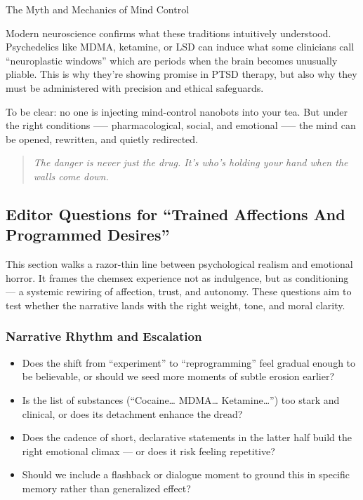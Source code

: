 \begin{PsychologicalSidebar}{The Myth and Mechanics of Mind Control}
  \medskip
  
  Modern neuroscience confirms what these traditions intuitively understood. Psychedelics like MDMA, ketamine, or LSD 
  can induce what some clinicians call “neuroplastic windows” which are periods when the brain becomes unusually 
  pliable. This is why they’re showing promise in PTSD therapy, but also why they must be administered with 
  precision and ethical safeguards. 

  \medskip
  
  To be clear: no one is injecting mind-control nanobots into your tea. But under the right conditions 
  —-- pharmacological, social, and emotional —-- the mind can be opened, rewritten, and quietly 
  redirected.
  
  \begin{quote}
  \textit{The danger is never just the drug. It’s who’s holding your hand when the walls come down.}
  \end{quote}
  
\end{PsychologicalSidebar}

\medskip


\subsection*{Editor Questions for ``Trained Affections And Programmed Desires''}

This section walks a razor-thin line between psychological realism and emotional horror. It frames the 
chemsex experience not as indulgence, but as conditioning — a systemic rewiring of affection, trust, 
and autonomy. These questions aim to test whether the narrative lands with the right weight, tone, 
and moral clarity.

\subsubsection*{Narrative Rhythm and Escalation}

\begin{itemize}
  \item Does the shift from “experiment” to “reprogramming” feel gradual enough to be believable, or should we seed more moments of subtle erosion earlier?
  \item Is the list of substances (``Cocaine… MDMA… Ketamine…'') too stark and clinical, or does its detachment enhance the dread?
  \item Does the cadence of short, declarative statements in the latter half build the right emotional climax — or does it risk feeling repetitive?
  \item Should we include a flashback or dialogue moment to ground this in specific memory rather than generalized effect?
\end{itemize}

